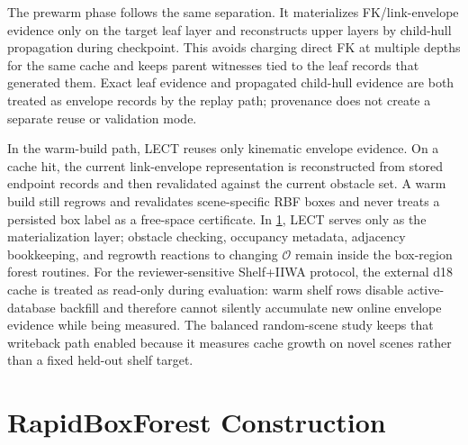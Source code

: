 \documentclass[journal]{IEEEtran}
\DeclareRobustCommand{\textsc}[1]{\textnormal{\MakeUppercase{#1}}}
\newcommand{\rbf}{\textsc{RBF}}
\begin{document}
The prewarm phase follows the same separation. It materializes FK/link-envelope
evidence only on the target leaf layer and reconstructs upper layers by
child-hull propagation during checkpoint. This avoids charging direct FK at
multiple depths for the same cache and keeps parent witnesses tied to the leaf
records that generated them.
Exact leaf evidence and propagated child-hull evidence are both treated as
envelope records by the replay path; provenance does not create a separate reuse
or validation mode.

In the warm-build path, LECT reuses only kinematic envelope evidence. On a cache
hit, the current link-envelope representation is reconstructed from stored
endpoint records and then revalidated against the current obstacle set. A warm
build still regrows and revalidates scene-specific \rbf{} boxes and never treats
a persisted box label as a free-space certificate. In \cref{sec:forest}, LECT
serves only as the materialization layer; obstacle checking, occupancy metadata,
adjacency bookkeeping, and regrowth reactions to changing $\mathcal{O}$ remain
inside the box-region forest routines. For the reviewer-sensitive Shelf+IIWA
protocol, the external d18 cache is treated as read-only during evaluation:
warm shelf rows disable active-database backfill and therefore cannot silently
accumulate new online envelope evidence while being measured. The balanced
random-scene study keeps that writeback path enabled because it measures cache
growth on novel scenes rather than a fixed held-out shelf target.

\section{RapidBoxForest Construction}\label{sec:forest}
\end{document}
